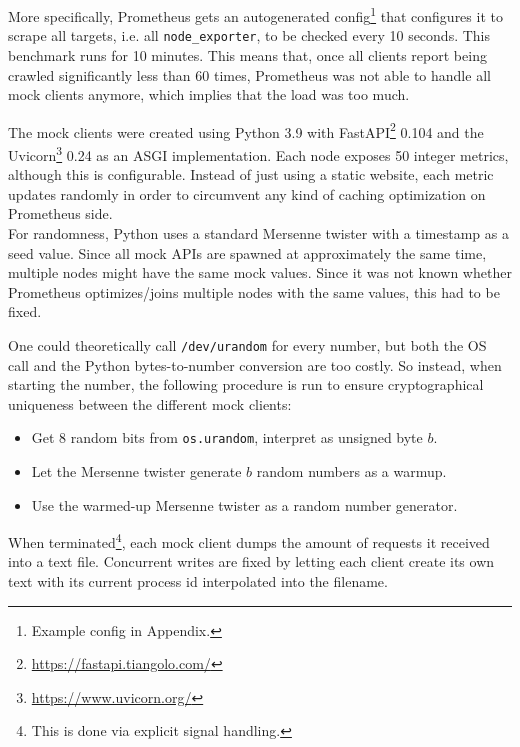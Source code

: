 More specifically, Prometheus gets an autogenerated config\footnote{Example config in Appendix.} that configures it to scrape all targets, i.e. all \texttt{node\_exporter}, to be checked every 10 seconds. This benchmark runs for 10 minutes. This means that, once all clients report being crawled significantly less than 60 times, Prometheus was not able to handle all mock clients anymore, which implies that the load was too much.

The mock clients were created using Python 3.9 with FastAPI\footnote{\url{https://fastapi.tiangolo.com/}} 0.104 and the Uvicorn\footnote{\url{https://www.uvicorn.org/}} 0.24 as an \ac{ASGI} implementation. Each node exposes 50 integer metrics, although this is configurable. Instead of just using a static website, each metric updates randomly in order to circumvent any kind of caching optimization on Prometheus side.\\

For randomness, Python uses a standard Mersenne twister with a timestamp as a seed value. Since all mock APIs are spawned at approximately the same time, multiple nodes might have the same mock values. Since it was not known whether Prometheus optimizes/joins multiple nodes with the same values, this had to be fixed.

One could theoretically call \texttt{/dev/urandom} for every number, but both the OS call and the Python bytes-to-number conversion are too costly. So instead, when starting the number, the following procedure is run to ensure cryptographical uniqueness between the different mock clients:
\begin{itemize}
  \item Get 8 random bits from \texttt{os.urandom}, interpret as unsigned byte $b$.
  \item Let the Mersenne twister generate $b$ random numbers as a warmup.
  \item Use the warmed-up Mersenne twister as a random number generator.
\end{itemize}

When terminated\footnote{This is done via explicit signal handling.}, each mock client dumps the amount of requests it received into a text file. Concurrent writes are fixed by letting each client create its own text with its current process id interpolated into the filename.\\

